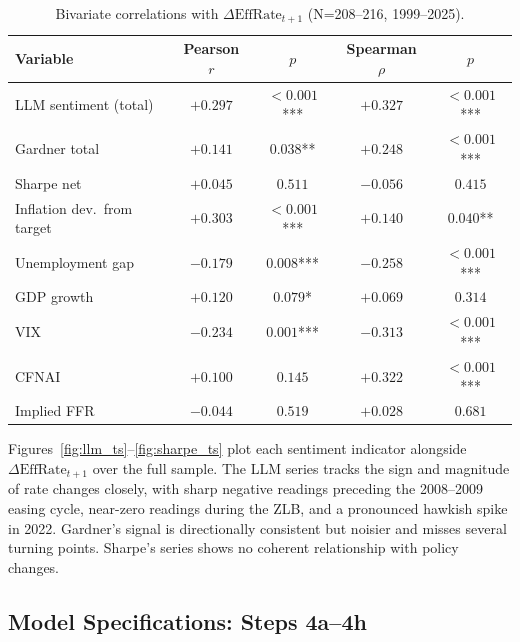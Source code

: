 \begin{table}[ht]
\centering
\caption{Bivariate correlations with $\Delta\text{EffRate}_{t+1}$ (N=208--216, 1999--2025).}
\label{tab:correlations}
\small
\begin{tabular}{lcccc}
\toprule
Variable & Pearson $r$ & $p$ & Spearman $\rho$ & $p$ \\
\midrule
LLM sentiment (total)     & $+0.297$ & $<0.001$*** & $+0.327$ & $<0.001$*** \\
Gardner total             & $+0.141$ & $0.038$**   & $+0.248$ & $<0.001$*** \\
Sharpe net                & $+0.045$ & $0.511$     & $-0.056$ & $0.415$     \\
\midrule
Inflation dev.\ from target & $+0.303$ & $<0.001$*** & $+0.140$ & $0.040$** \\
Unemployment gap          & $-0.179$ & $0.008$***  & $-0.258$ & $<0.001$*** \\
GDP growth                & $+0.120$ & $0.079$*    & $+0.069$ & $0.314$     \\
VIX                       & $-0.234$ & $0.001$***  & $-0.313$ & $<0.001$*** \\
CFNAI                     & $+0.100$ & $0.145$     & $+0.322$ & $<0.001$*** \\
Implied FFR               & $-0.044$ & $0.519$     & $+0.028$ & $0.681$     \\
\bottomrule
\end{tabular}
\end{table}

Figures~\ref{fig:llm_ts}--\ref{fig:sharpe_ts} plot each sentiment indicator alongside $\Delta\text{EffRate}_{t+1}$ over the full sample. The LLM series tracks the sign and magnitude of rate changes closely, with sharp negative readings preceding the 2008--2009 easing cycle, near-zero readings during the ZLB, and a pronounced hawkish spike in 2022. Gardner's signal is directionally consistent but noisier and misses several turning points. Sharpe's series shows no coherent relationship with policy changes.


\subsection{Model Specifications: Steps 4a--4h}

